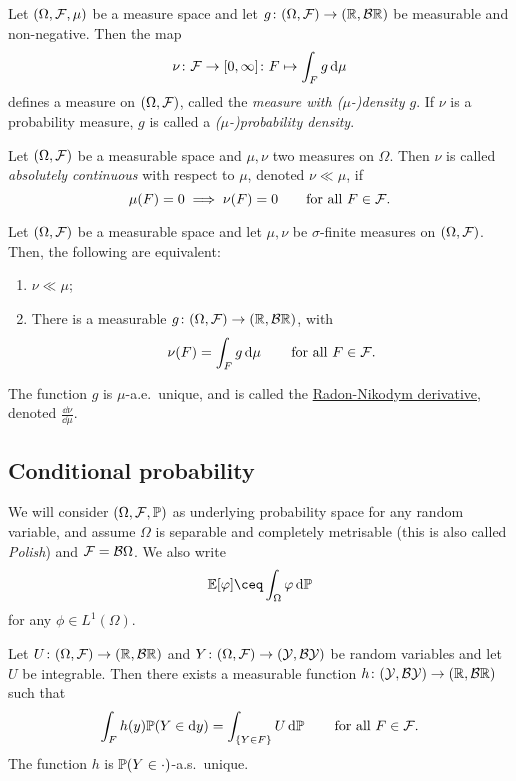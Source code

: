 \begin{definition}
	Let $(\Omega, \mathcal F, \mu)$ be a measure space and let $g \colon (\Omega, \mathcal F) \to (\mathbb R, \mathcal B \mathbb R)$ be measurable and non-negative. Then the map 
	\[
	\nu \colon \mathcal F \to [0, \infty] \colon F \mapsto \int_F g \dd{\mu}
	\]
	defines a measure on $(\Omega, \mathcal F)$, called the \emph{measure with ($\mu$-)density $g$}. If $\nu$ is a probability measure, $g$ is called a \emph{($\mu$-)probability density}. 
\end{definition}

\begin{definition}
	Let $(\Omega, \mathcal F)$ be a measurable space and $\mu, \nu$ two measures on $\Omega$. Then $\nu$ is called \emph{absolutely continuous} with respect to $\mu$, denoted $\nu \ll \mu$, if \[\mu(F) = 0 \implies \nu(F) =0 \qquad\text{for all $F \in \mathcal F$}. 
\]
\end{definition}

\begin{theorem}
	Let $(\Omega, \mathcal F)$ be a measurable space and let $\mu, \nu$ be $\sigma$-finite measures on $(\Omega, \mathcal F)$. Then, the following are equivalent:
	\begin{enumerate}
		\item $\nu \ll \mu$;
		\item There is a measurable $g \colon (\Omega, \mathcal F) \to (\mathbb R, \mathcal B\mathbb R)$, with
		\[
		\nu(F) = \int_F g \dd{\mu} \qquad\text{for all $F \in \mathcal F$}. 
		\]
	\end{enumerate}
The function $g$ is $\mu$-a.e.\ unique, and is called the \uline{Radon-Nikodym derivative}, denoted $\frac{\dd{\nu}}{\dd{\mu}}$. 
\end{theorem}

\subsection{Conditional probability}
We will consider $(\Omega, \mathcal F, \mathbb P)$ as underlying probability space for any random variable, and assume $\Omega$ is separable and completely metrisable (this is also called \emph{Polish}) and $\mathcal F = \mathcal B\Omega$. We also write
\[
\EE[\phi] \ceq \int_\Omega \phi \dd{\PP}
\]
for any $\phi \in L^1(\Omega)$. 

\begin{theorem}
	Let $U \colon (\Omega, \mathcal F) \to (\mathbb R, \mathcal B\mathbb R)$ and $Y \colon (\Omega, \mathcal F) \to (\mathcal Y, \mathcal B\mathcal Y)$ be random variables and let $U$ be integrable. Then there exists a measurable function $h \colon (\mathcal Y, \mathcal B\mathcal Y) \to(\mathbb R, \mathcal B\mathbb R)$ such that
	\[
	\int_F h(y) \mathbb P(Y \in \dd{y}) = \int_{\qty{Y\in F}} U \dd{\mathbb P} \qquad\text{for all $F \in \mathcal F$}. 
	\]
	The function $h$ is $\mathbb P(Y \in \cdot)$-a.s.\ unique.
\end{theorem}

